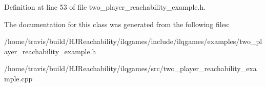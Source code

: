 Definition at line 53 of file two\+\_\+player\+\_\+reachability\+\_\+example.\+h.



The documentation for this class was generated from the following files\+:\begin{DoxyCompactItemize}
\item 
/home/travis/build/\+H\+J\+Reachability/ilqgames/include/ilqgames/examples/two\+\_\+player\+\_\+reachability\+\_\+example.\+h\item 
/home/travis/build/\+H\+J\+Reachability/ilqgames/src/two\+\_\+player\+\_\+reachability\+\_\+example.\+cpp\end{DoxyCompactItemize}
